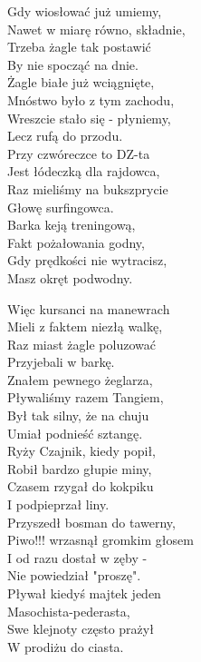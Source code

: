 \begin{multicols}{2}
Gdy wiosłować już umiemy, \\
Nawet w miarę równo, składnie, \\
Trzeba żagle tak postawić\\
By nie spocząć na dnie.\\

Żagle białe już wciągnięte, \\
Mnóstwo było z tym zachodu, \\
Wreszcie stało się - płyniemy, \\
Lecz rufą do przodu.\\

Przy czwóreczce to DZ-ta\\
Jest łódeczką dla rajdowca, \\
Raz mieliśmy na bukszprycie\\
Głowę surfingowca.\\

Barka keją treningową, \\
Fakt pożałowania godny, \\
Gdy prędkości nie wytracisz, \\
Masz okręt podwodny.\\
\newcolumn

Więc kursanci na manewrach\\
Mieli z faktem niezłą walkę, \\
Raz miast żagle poluzować\\
Przyjebali w barkę.\\

Znałem pewnego żeglarza, \\
Pływaliśmy razem Tangiem, \\
Był tak silny, że na chuju\\
Umiał podnieść sztangę.\\

Ryży Czajnik, kiedy popił, \\
Robił bardzo głupie miny, \\
Czasem rzygał do kokpiku\\
I podpieprzał liny.\\

Przyszedł bosman do tawerny, \\
Piwo!!! wrzasnął gromkim głosem\\
I od razu dostał w zęby -\\
Nie powiedział "proszę".\\

Pływał kiedyś majtek jeden\\
Masochista-pederasta, \\
Swe klejnoty często prażył\\
W prodiżu do ciasta.\\


\end{multicols}
